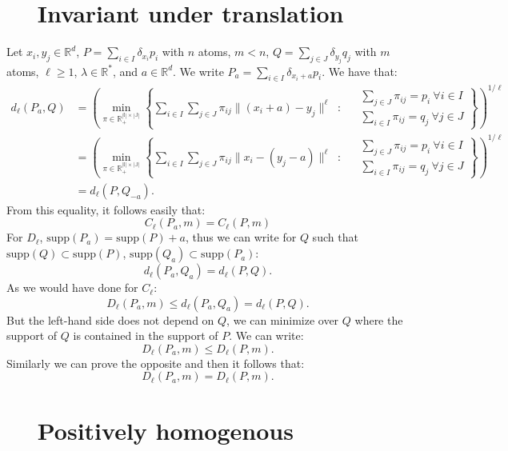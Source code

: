\documentclass{amsart}
\newcommand{\RR}{\mathbb{R}}
\begin{document}
\begin{appendices}
\section{$\quad$ Invariant under translation }\label{appendix restrict}
\noindent Let $x_i,y_j\in\RR^d$, $P=\sum_{i\in I}\delta_{x_i}p_i$ with $n$ atoms, $m<n$, $Q=\sum_{j\in J}\delta_{y_j}q_j$ with $m$ atoms, $\ell\geq1$, $\lambda\in\RR^*$, and $a\in\RR^d$. We write $P_a=\sum_{i\in I}\delta_{x_i+a}p_i$. We have that:
\begin{align*}
d_\ell(P_a,Q)&=\left(\min_{\pi\in\mathbb{R_+^{|I|\times|J|}}}\left\{ 
\sum_{i\in I}\sum_{j\in J}\pi_{ij}\lVert \left(x_i+a\right)-y_j\rVert^\ell \: \text{ : } \:  \begin{aligned}
& \sum_{j\in J}\pi_{ij}=p_i \: \forall i\in I \\
& \sum_{i\in I}\pi_{ij}=q_j \: \forall j\in J
\end{aligned}\right\}\right)^{1/\ell}
\\ &= \left(\min_{\pi\in\mathbb{R_+^{|I|\times|J|}}}\left\{ 
\sum_{i\in I}\sum_{j\in J}\pi_{ij}\lVert x_i-\left(y_j-a\right)\rVert^\ell \: \text{ : } \:  \begin{aligned}
& \sum_{j\in J}\pi_{ij}=p_i \: \forall i\in I \\
& \sum_{i\in I}\pi_{ij}=q_j \: \forall j\in J
\end{aligned}\right\}\right)^{1/\ell}
\\ &=d_\ell\left(P,Q_{-a}\right).
\end{align*}
From this equality, it follows easily that:
$$
C_\ell\left(P_a,m\right)=C_\ell\left(P,m\right)
$$
For $D_\ell$, $\text{supp}\left(P_a\right)=\text{supp}\left(P\right)+a$, thus we can write for $Q$ such that $\text{supp}\left(Q\right)\subset \text{supp}\left(P\right)$, $\text{supp}\left(Q_a\right)\subset \text{supp}\left(P_a\right)$:
$$
d_\ell(P_a,Q_a)=d_\ell(P,Q).
$$
As we would have done for $C_\ell$:
$$
D_\ell\left(P_a,m\right)\leq d_\ell(P_a,Q_a) = d_\ell(P,Q).
$$
But the left-hand side does not depend on $Q$, we can minimize over $Q$ where the support of $Q$ is contained in the support of $P$. We can write:
$$
D_\ell\left(P_a,m\right)\leq D_\ell\left(P,m\right).
$$
Similarly we can prove the opposite and then it follows that:
$$
D_\ell\left(P_a,m\right)= D_\ell\left(P,m\right).
$$
\section{$\quad$ Positively homogenous}\label{appendix homogen}


\end{appendices}
\end{document}
